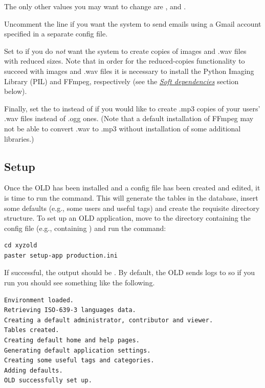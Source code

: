 \documentclass[letterpaper,10pt,english]{sphinxmanual}
\begin{document}
The only other values you may want to change are ,
 and .

Uncomment the  line if you want
the system to send emails using a Gmail account specified in a separate
 config file.

Set  to  if you do \emph{not} want the system
to create copies of images and .wav files with reduced sizes.  Note that in
order for the reduced-copies functionality to succeed with images and .wav files
it is necessary to install the Python Imaging Library (PIL) and FFmpeg,
respectively (see the {\hyperref[installation:soft-dependecies]{\emph{Soft dependencies}}} section below).

Finally, set the  to  instead of 
if you would like to create .mp3 copies of your users' .wav files instead of
.ogg ones. (Note that a default installation of FFmpeg may not be able to
convert .wav to .mp3 without installation of some additional libraries.)


\subsection{Setup}
\label{installation:setup}
Once the OLD has been installed and a config file has been created and edited,
it is time to run the  command.  This will generate the tables in the
database, insert some defaults (e.g., some users and useful tags) and create
the requisite directory structure.  To set up an OLD application, move to the
directory containing the config file (e.g.,  containing
) and run the  command:

\begin{Verbatim}[commandchars=\\\{\}]
cd xyzold
paster setup-app production.ini
\end{Verbatim}

If successful, the output should be .  By default, the OLD sends logs to
 so if you run  you should see
something like the following.

\begin{Verbatim}[commandchars=\\\{\}]
Environment loaded.
Retrieving ISO-639-3 languages data.
Creating a default administrator, contributor and viewer.
Tables created.
Creating default home and help pages.
Generating default application settings.
Creating some useful tags and categories.
Adding defaults.
OLD successfully set up.
\end{Verbatim}
\end{document}
